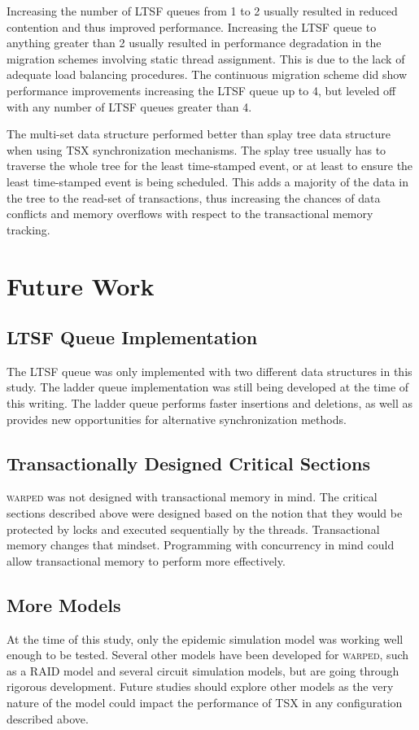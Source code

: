 \documentclass[11pt]{book}
\begin{document}
Increasing the number of LTSF queues from 1 to 2 usually resulted in reduced
contention and thus improved performance.  Increasing the LTSF queue to anything
greater than 2 usually resulted in performance degradation in the migration
schemes involving static thread assignment.  This is due to the
lack of adequate load balancing procedures.  The continuous migration scheme did
show performance improvements increasing the LTSF queue up to 4, but leveled
off with any number of LTSF queues greater than 4.  

The multi-set data structure performed better than splay tree data structure
when using TSX synchronization mechanisms.  The splay tree usually has to
traverse the whole tree for the least time-stamped event, or at least to ensure
the least time-stamped event is being scheduled.  This adds a majority of the
data in the tree to the read-set of transactions, thus increasing the chances of
data conflicts and memory overflows with respect to the transactional memory
tracking.

\section{Future Work}

\subsection{LTSF Queue Implementation}

The LTSF queue was only implemented with two different data structures in this
study.  The ladder queue implementation was still being developed at the time of
this writing.  The ladder queue performs faster insertions and deletions, as
well as provides new opportunities for alternative synchronization methods. 

\subsection{Transactionally Designed Critical Sections}

\textsc{warped} was not designed with transactional memory in mind.  The
critical sections described above were designed based on the notion that they
would be protected by locks and executed sequentially by the threads.
Transactional memory changes that mindset.  Programming with concurrency in mind
could allow transactional memory to perform more effectively.

\subsection{More Models}

At the time of this study, only the epidemic simulation model was working well
enough to be tested.  Several other models have been developed for
\textsc{warped}, such as a RAID model and several circuit simulation models, but
are going through rigorous development.  Future studies should explore other
models as the very nature of the model could impact the performance of TSX in
any configuration described above.

\newpage


\end{document}
